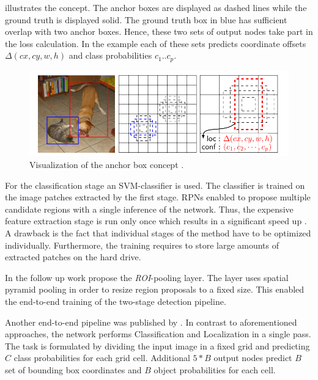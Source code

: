 	 illustrates the concept. The anchor boxes are displayed as dashed lines while the ground truth is displayed solid. The ground truth box in blue has sufficient overlap with two anchor boxes. Hence, these two sets of output nodes take part in the loss calculation. In the example each of these sets predicts coordinate offsets $\Delta(cx, cy, w,h)$ and class probabilities $c_1 .. c_p$.
	
\begin{figure}[hbtp]
	
	\centering
	\captionsetup{justification=raggedright,singlelinecheck=false}
	\includegraphics[width=0.8\linewidth]{fig/anchors}
	\caption{Visualization of the anchor box concept \cite{Liu}.}
	\label{fig:anchors}
	
\end{figure}

For the classification stage an \ac{SVM}-classifier is used. The classifier is trained on the image patches extracted by the first stage. \acp{RPN} enabled to propose multiple candidate regions with a single inference of the network. Thus, the expensive feature extraction stage is run only once which results in a significant speed up . A drawback is the fact that individual stages of the method have to be optimized individually. Furthermore, the training requires to store large amounts of extracted patches on the hard drive.

In the follow up work \cite{Ren} propose the \textit{ROI}-pooling layer. The layer uses spatial pyramid pooling in order to resize region proposals to a fixed size. This enabled the end-to-end training of the two-stage detection pipeline. 
	
Another end-to-end pipeline was published by \citeauthor{Redmon} \cite{Redmon}. In contrast to aforementioned approaches, the network performs Classification and Localization in a single pass. The task is formulated by dividing the input image in a fixed grid and predicting $C$ class probabilities for each grid cell. Additional $5*B$ output nodes predict $B$ set of bounding box coordinates and $B$ object probabilities for each cell. 

